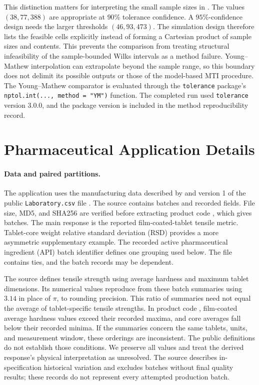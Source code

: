 \documentclass[11pt]{article}
\begin{document}
This distinction matters for interpreting the small sample sizes in
\citet{PourmohamadRichardsonSanso2026CalibratedBNP}. The values
\((38,77,388)\) are appropriate at \(90\%\) tolerance confidence. A
\(95\%\)-confidence design needs the larger thresholds \((46,93,473)\). The
simulation design therefore lists the feasible cells explicitly instead of
forming a Cartesian product of sample sizes and contents. This prevents the
comparison from treating structural infeasibility of the sample-bounded
Wilks intervals as a method failure. Young--Mathew interpolation can
extrapolate beyond the sample range, so this boundary does not delimit its
possible outputs or those of the model-based MTI procedure.
The Young--Mathew comparator is evaluated through the \texttt{tolerance}
package's \texttt{nptol.int(..., method = "YM")} function. The completed
run used \texttt{tolerance} version 3.0.0, and the package version is included
in the method reproducibility record.

\section{Pharmaceutical Application Details}
\label{sec:supp-pharma-application}


\paragraph{Data and paired partitions.}
The application uses the manufacturing data described by
\citet{ZagarMihelic2022PharmaManufacturing} and version 1 of the public
\texttt{Laboratory.csv} file \citep{ZagarMihelic2021LaboratoryCsv}. The source
contains \PharmaRawBatches{} batches and \PharmaRawFields{} recorded fields.
File size, MD5, and SHA256 are verified before extracting product code
\PharmaProductCode{}, which gives \PharmaBatches{} batches. The main response
is the reported film-coated-tablet tensile metric. Tablet-core
weight relative standard deviation (RSD) provides a more asymmetric
supplementary example. The recorded active pharmaceutical ingredient (API)
batch identifier defines one grouping used below. The file contains ties,
and the batch records may be dependent.

The source defines tensile strength using average hardness and maximum tablet
dimensions. Its numerical values reproduce from these batch summaries using
\(3.14\) in place of \(\pi\), to rounding precision. This ratio of summaries
need not equal the average of tablet-specific tensile strengths. In product
code \PharmaProductCode{}, \PharmaFctHardnessQuestions{} film-coated average
hardness values exceed their recorded maxima, and
\PharmaCoreHardnessQuestions{} core averages fall below their recorded minima.
If the summaries concern the same tablets, units, and measurement window,
these orderings are inconsistent. The public definitions do not establish
those conditions. We preserve all values and treat the derived response's
physical interpretation as unresolved. The source describes in-specification
historical variation and excludes batches without final quality results;
these records do not represent every attempted production batch.
\end{document}
